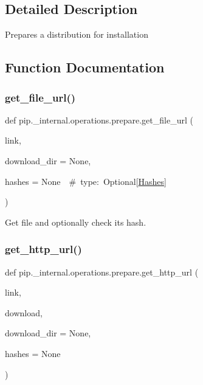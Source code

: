 \subsection{Detailed Description}
\begin{DoxyVerb}Prepares a distribution for installation
\end{DoxyVerb}
 

\subsection{Function Documentation}
\mbox{\label{namespacepip_1_1__internal_1_1operations_1_1prepare_a10a9df8c34e4824a1b3ce7dc3616736d}} 
\subsubsection{\texorpdfstring{get\+\_\+file\+\_\+url()}{get\_file\_url()}}
{\footnotesize\ttfamily def pip.\+\_\+internal.\+operations.\+prepare.\+get\+\_\+file\+\_\+url (\begin{DoxyParamCaption}\item[{}]{link,  }\item[{}]{download\+\_\+dir = {\ttfamily None},  }\item[{}]{hashes = {\ttfamily None~~\#~type\+:~Optional\mbox{[}\hyperlink{classpip_1_1__internal_1_1utils_1_1hashes_1_1Hashes}{Hashes}\mbox{]}} }\end{DoxyParamCaption})}

\begin{DoxyVerb}Get file and optionally check its hash.
\end{DoxyVerb}
 \mbox{\label{namespacepip_1_1__internal_1_1operations_1_1prepare_a1b810f7f0cec5fe7b3b2296548d80f6d}} 
\subsubsection{\texorpdfstring{get\+\_\+http\+\_\+url()}{get\_http\_url()}}
{\footnotesize\ttfamily def pip.\+\_\+internal.\+operations.\+prepare.\+get\+\_\+http\+\_\+url (\begin{DoxyParamCaption}\item[{}]{link,  }\item[{}]{download,  }\item[{}]{download\+\_\+dir = {\ttfamily None},  }\item[{}]{hashes = {\ttfamily None} }\end{DoxyParamCaption})}

